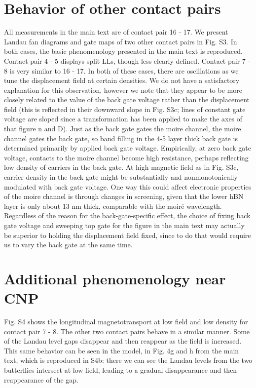 \documentclass[12pt,twocolumn]{article}
\begin{document}
\section{Behavior of other contact pairs}
All measurements in the main text are of contact pair 16 - 17. We present Landau fan diagrams and gate maps of two other contact pairs in Fig. S3. In both cases, the basic phenomenology presented in the main text is reproduced. Contact pair 4 - 5 displays split LLs, though less clearly defined. Contact pair 7 - 8 is very similar to 16 - 17. In both of these cases, there are oscillations as we tune the displacement field at certain densities. We do not have a satisfactory explanation for this observation, however we note that they appear to be more closely related to the value of the back gate voltage rather than the displacement field (this is reflected in their downward slope in Fig. S3c; lines of constant gate voltage are sloped since a transformation has been applied to make the axes of that figure n and D). Just as the back gate gates the moire channel, the moire channel gates the back gate, so band filling in the 4-5 layer thick back gate is determined primarily by applied back gate voltage. Empirically, at zero back gate voltage, contacts to the moire channel become high resistance, perhaps reflecting low density of carriers in the back gate. At high magnetic field as in Fig. S3c, carrier density in the back gate might be substantially and nonmonotonically modulated with back gate voltage. One way this could affect electronic properties of the moire channel is through changes in screening, given that the lower hBN layer is only about 13 nm thick, comparable with the moiré wavelength. Regardless of the reason for the back-gate-specific effect, the choice of fixing back gate voltage and sweeping top gate for the figure in the main text may actually be superior to holding the displacement field fixed, since to do that would require us to vary the back gate at the same time.

\section{Additional phenomenology near CNP}
Fig. S4 shows the longitudinal magnetotransport at low field and low density for contact pair 7 - 8. The other two contact pairs behave in a similar manner. Some of the Landau level gaps disappear and then reappear as the field is increased. This same behavior can be seen in the model, in Fig. 4g and h from the main text, which is reproduced in S4b: there we can see the Landau levels from the two butterflies intersect at low field, leading to a gradual disappearance and then reappearance of the gap.
\end{document}

